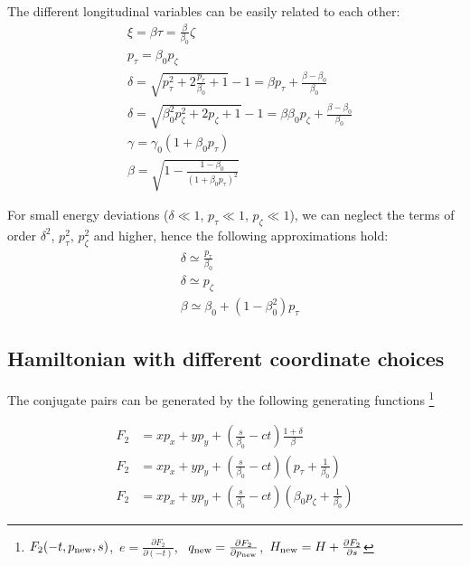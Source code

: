 
The different longitudinal variables can be easily related to each other:
\begin{align}
  &\xi=
      \beta\tau =
      \frac{\beta}{\beta_0}\zeta \\
  &p_\tau = \beta_0 p_\zeta\\
  &\delta= \sqrt{p_\tau^2 + 2 \frac{p_\tau}{\beta_0} +1} - 1
       =\beta p_\tau + \frac{\beta-\beta_0}{\beta_0}\\
  &\delta= \sqrt{\beta_0^2p_\zeta^2 + 2 p_\zeta +1} - 1
      =\beta\beta_0 p_\zeta + \frac{\beta-\beta_0}{\beta_0}\\
  &\gamma = \gamma_0 (1 + \beta_0 p_\tau)\\
  &\beta = \sqrt{1 - \frac{1 - \beta_0}{\left(1 + \beta_0 p_\tau\right)^2}}
\end{align}

For small energy deviations ($\delta \ll 1$, $p_\tau \ll 1$, $p_\zeta \ll 1$),
we can neglect the terms of order $\delta^2$, $p_\tau^2$, $p_\zeta^2$ and higher, hence
the following approximations hold:
\begin{align}
  &\delta \simeq \frac{p_\tau}{\beta_0} \\
  &\delta \simeq p_\zeta \\
  &\beta \simeq \beta_0 + (1 - \beta_0^2) p_\tau
\end{align}

\subsection{Hamiltonian with different coordinate choices}

The conjugate pairs can be generated by the following generating functions \footnote{
$F_2(-t , p_{\rm new}, s)$,\,
$e = \frac{\partial F_2}{\partial (-t)}$, \,
$q_{\rm new} = \frac{\partial F_2}{\partial p_{\rm new}}$,\,
$H_{\rm new} = H + \frac{\partial F_2}{\partial s}$
}

\begin{align}
F_2& = x p_x + y p_y + \left(\frac{s}{\beta_0}-ct\right)
                            \frac{1+\delta}{\beta} \\
F_2& = x p_x + y p_y + \left(\frac{s}{\beta_0}-ct\right)
                            \left(p_\tau + \frac{1}{\beta_0}\right) \\
F_2& = x p_x + y p_y + \left(\frac{s}{\beta_0}-ct\right)
                            \left(\beta_0 p_\zeta + \frac{1}{\beta_0}\right)
\end{align}

